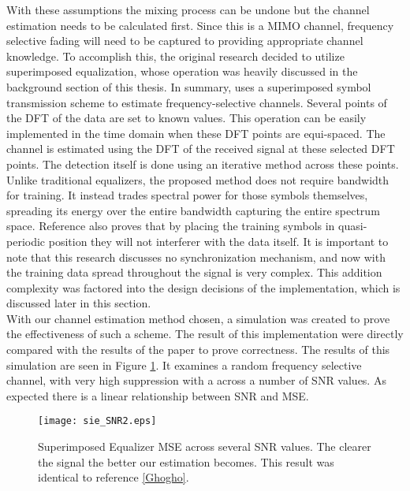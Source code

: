 With these assumptions the mixing process can be undone but the channel estimation needs to be calculated first.  Since this is a MIMO channel, frequency selective fading will need to be captured to providing appropriate channel knowledge.  To accomplish this, the original research decided to utilize superimposed equalization, whose operation was heavily discussed in the background section of this thesis.  In summary, \cite{Ghogho} uses a superimposed symbol transmission scheme to estimate frequency-selective channels. Several points of the DFT of the data are set to known values. This operation can be easily implemented in the time domain when these DFT points are equi-spaced. The channel is estimated using the DFT of the received signal at these selected DFT points. The detection itself is done using an iterative method across these points.  Unlike traditional equalizers, the proposed method does not require bandwidth for training.  It instead trades spectral power for those symbols themselves, spreading its energy over the entire bandwidth capturing the entire spectrum space.  Reference \cite{Ghogho} also proves that by placing the training symbols in quasi-periodic position they will not interferer with the data itself.  It is important to note that this research discusses no synchronization mechanism, and now with the training data spread throughout the signal is very complex.  This addition complexity was factored into the design decisions of the implementation, which is discussed later in this section.\\

With our channel estimation method chosen, a simulation was created to prove the effectiveness of such a scheme.  The result of this implementation were directly compared with the results of the paper to prove correctness.  %
The results of this simulation are seen in Figure \ref{sie}.  It examines a random frequency selective channel, with very high suppression with a across a number of SNR values.  As expected there is a linear relationship between SNR and MSE.\\  %

\begin{figure}[!ht]\label{sie}
\centering
\texttt{[image: sie\_SNR2.eps]}
\caption{Superimposed Equalizer MSE across several SNR values.  The clearer the signal the better our estimation becomes.  This result was identical to reference \ref{Ghogho}.}
\end{figure}

